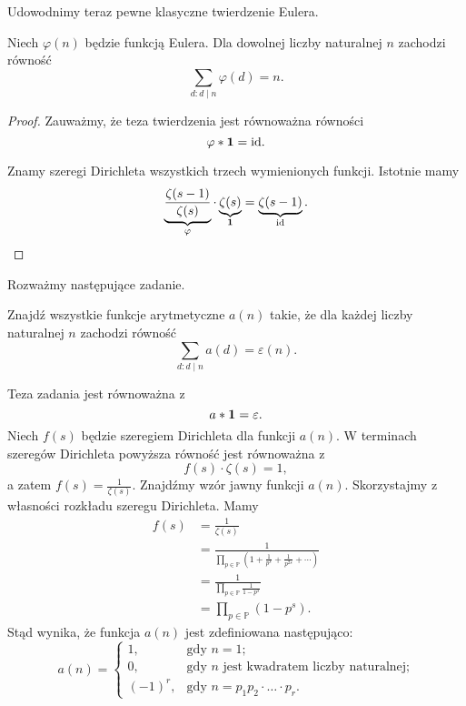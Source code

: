 \documentclass[shortabstract]{imthesis}
\begin{document}
Udowodnimy teraz pewne klasyczne twierdzenie Eulera.
\begin{theorem}
    Niech $\varphi(n)$ będzie funkcją Eulera. Dla dowolnej liczby naturalnej $n$ zachodzi równość
    $$
    \sum_{d : d\mid n} \varphi(d) = n.
    $$
\end{theorem}
\begin{proof}
    Zauważmy, że teza twierdzenia jest równoważna równości
    $$
    \varphi * \mathbf{1} = \text{id}.
    $$

    Znamy szeregi Dirichleta wszystkich trzech wymienionych funkcji. Istotnie mamy
    $$
    \underbrace{\frac{\zeta(s-1)}{\zeta(s)}}_{\varphi} \cdot \underbrace{\zeta(s)}_{\mathbf{1}} = \underbrace{\zeta(s-1)}_{\text{id}}.
    $$
\end{proof}

Rozważmy następujące zadanie.

\begin{problem}
    Znajdź wszystkie funkcje arytmetyczne $a(n)$ takie, że dla każdej liczby naturalnej $n$ zachodzi równość
    $$
    \sum_{d : d\mid n} a(d) = \varepsilon(n).
    $$
\end{problem}
\begin{solution}
    Teza zadania jest równoważna z
    $$
    a * \mathbf{1} = \varepsilon.
    $$
    Niech $f(s)$ będzie szeregiem Dirichleta dla funkcji $a(n)$. W terminach szeregów Dirichleta powyższa równość jest równoważna z
    $$
    f(s) \cdot \zeta(s) = 1,
    $$
    a zatem $f(s) = \frac{1}{\zeta(s)}$. Znajdźmy wzór jawny funkcji $a(n)$. Skorzystajmy z własności rozkładu szeregu Dirichleta. Mamy
    \begin{align*}
    f(s) &= \frac{1}{\zeta(s)} \\
    &= \frac{1}{\prod_{p \in \mathbb{P}} \left(1 + \frac{1}{p^s} + \frac{1}{p^{2s}} + \cdots\right)} \\
    &= \frac{1}{\prod_{p \in \mathbb{P}} \frac{1}{1-p^s}} \\
    &= \prod_{p \in \mathbb{P}} (1-p^s).
    \end{align*}
    Stąd wynika, że funkcja $a(n)$ jest zdefiniowana następująco:
    $$
    a(n) = \begin{cases} 1, &\text{gdy $n = 1$;} \\ 0, &\text{gdy $n$ jest kwadratem liczby naturalnej;} \\ (-1)^r, &\text{gdy $n = p_1p_2\cdot\ldots\cdot p_r$.} \end{cases}
    $$
\end{solution}
\end{document}
